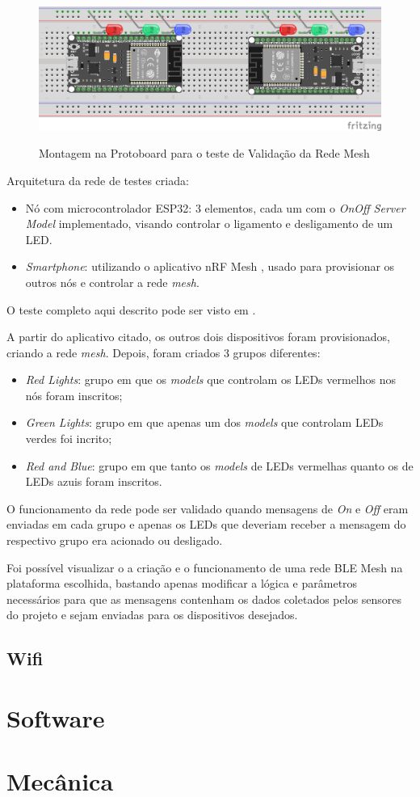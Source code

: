 \documentclass[../monografia.tex]{subfiles}
\begin{document}
\begin{figure}[h]
	\centering
		\includegraphics[width=.8\textwidth]{mesh_test}
		\label{fig:test}
		\caption{Montagem na Protoboard para o teste de Validação da Rede Mesh}
\end{figure}

Arquitetura da rede de testes criada:

\begin{itemize}
	\item Nó com microcontrolador ESP32: 3 elementos, cada um com o \textit{OnOff Server Model} \cite{ble-mesh-models} implementado, visando controlar o ligamento e desligamento de um LED.
	\item \textit{Smartphone}: utilizando o aplicativo nRF Mesh \cite{nrf-app}, usado para provisionar os outros nós e controlar a rede \textit{mesh}.
\end{itemize}

O teste completo aqui descrito pode ser visto em \cite{teste-ble-mesh}.

A partir do aplicativo citado, os outros dois dispositivos foram provisionados, criando a rede \textit{mesh}. Depois, foram criados 3 grupos diferentes:

\begin{itemize}
	\item \textit{Red Lights}: grupo em que os \textit{models} que controlam os LEDs vermelhos nos nós foram inscritos;
	\item \textit{Green Lights}: grupo em que apenas um dos \textit{models} que controlam LEDs verdes foi incrito;
	\item \textit{Red and Blue}: grupo em que tanto os \textit{models} de LEDs vermelhas quanto os de LEDs azuis foram inscritos.
\end{itemize}

O funcionamento da rede pode ser validado quando mensagens de \textit{On} e \textit{Off} eram enviadas em cada grupo e apenas os LEDs que deveriam receber a mensagem do respectivo grupo era acionado ou desligado.

Foi possível visualizar o a criação e o funcionamento de uma rede BLE Mesh na plataforma escolhida, bastando apenas modificar a lógica e parâmetros necessários para que as mensagens contenham os dados coletados pelos sensores do projeto e sejam enviadas para os dispositivos desejados.

\subsection{Wifi}
\section{Software}
\section{Mecânica}
\end{document}
